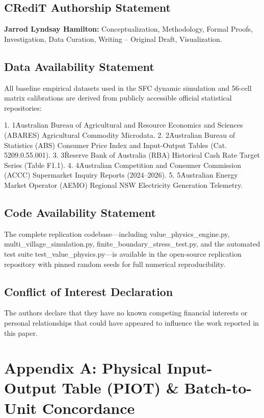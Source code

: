 \documentclass[preprint,12pt,authoryear]{elsarticle}
\theoremstyle{definition}
\begin{document}
\subsection{CRediT Authorship Statement}
\textbf{Jarrod Lyndsay Hamilton:} Conceptualization, Methodology, Formal Proofs, Investigation, Data Curation, Writing -- Original Draft, Visualization.

\subsection{Data Availability Statement}

All baseline empirical datasets used in the SFC dynamic simulation and 56-cell matrix calibrations are derived from publicly accessible official statistical repositories:

1.  1\. Australian Bureau of Agricultural and Resource Economics and Sciences (ABARES) Agricultural Commodity Microdata.
2.  2\. Australian Bureau of Statistics (ABS) Consumer Price Index and Input-Output Tables (Cat. 5209.0.55.001). 
3.  3\. Reserve Bank of Australia (RBA) Historical Cash Rate Target Series (Table F1.1).
4.  4\. Australian Competition and Consumer Commission (ACCC) Supermarket Inquiry Reports (2024–2026).
5.  5\. Australian Energy Market Operator (AEMO) Regional NSW Electricity Generation Telemetry.

\subsection{Code Availability Statement}

The complete replication codebase—including value\_physics\_engine.py, multi\_village\_simulation.py, finite\_boundary\_stress\_test.py, and the automated test suite test\_value\_physics.py—is available in the open-source replication repository with pinned random seeds for full numerical reproducibility.

\subsection{Conflict of Interest Declaration}

The authors declare that they have no known competing financial interests or personal relationships that could have appeared to influence the work reported in this paper.





\section*{Appendix A: Physical Input-Output Table (PIOT) \& Batch-to-Unit Concordance}
\end{document}
